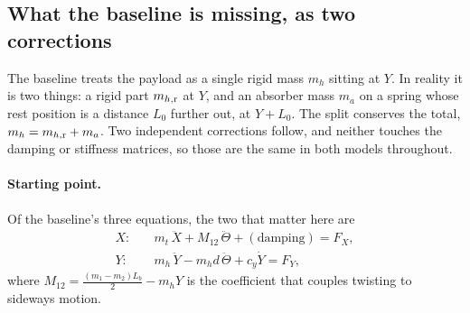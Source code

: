 %
%
%     
%

\subsection{What the baseline is missing, as two corrections}

The baseline treats the payload as a single rigid mass $m_h$ sitting at $Y$. In reality it is
two things: a rigid part $m_{h,\mathrm{r}}$ at $Y$, and an absorber mass $m_a$ on a spring whose rest
position is a distance $L_0$ further out, at $Y+L_0$. The split conserves the total,
$m_h = m_{h,\mathrm{r}} + m_a$. Two independent corrections follow, and neither touches the damping or
stiffness matrices, so those are the same in both models throughout.

\paragraph{Starting point.} Of the baseline's three equations, the two that matter here are
%
\begin{align}
  X:\quad & m_t\,\ddot X + M_{12}\,\ddot\Theta + (\text{damping}) = F_X , \label{eq:fix-baseX}\\
  Y:\quad & m_h\,\ddot Y - m_h d\,\ddot\Theta + c_y \dot Y = F_Y , \label{eq:fix-baseY}
\end{align}
%
where $M_{12} = \tfrac{(m_1-m_2)L_b}{2} - m_h Y$ is the coefficient that couples twisting to
sideways motion.


